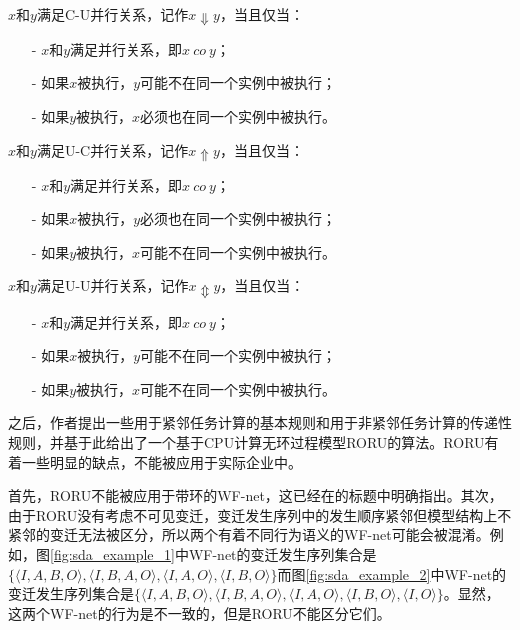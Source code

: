 \begin{definition}\label{def:c_u_concurrency}
$x$和$y$满足C-U并行关系，记作$x\Downarrow y$，当且仅当：
  \begin{itemize}
    \item[-] $x$和$y$满足并行关系，即$x~co~y$；
    \item[-] 如果$x$被执行，$y$可能不在同一个实例中被执行；
    \item[-] 如果$y$被执行，$x$必须也在同一个实例中被执行。
  \end{itemize}
\end{definition}

\begin{definition}\label{def:u_c_concurrency}
$x$和$y$满足U-C并行关系，记作$x\Uparrow y$，当且仅当：
  \begin{itemize}
    \item[-] $x$和$y$满足并行关系，即$x~co~y$；
    \item[-] 如果$x$被执行，$y$必须也在同一个实例中被执行；
    \item[-] 如果$y$被执行，$x$可能不在同一个实例中被执行。
  \end{itemize}
\end{definition}

\begin{definition}\label{def:u_u_concurrency}
$x$和$y$满足U-U并行关系，记作$x\Updownarrow y$，当且仅当：
  \begin{itemize}
    \item[-] $x$和$y$满足并行关系，即$x~co~y$；
    \item[-] 如果$x$被执行，$y$可能不在同一个实例中被执行；
    \item[-] 如果$y$被执行，$x$可能不在同一个实例中被执行。
  \end{itemize}
\end{definition}

之后，作者提出一些用于紧邻任务计算的基本规则和用于非紧邻任务计算的传递性规则，并基于此给出了一个基于CPU计算无环过程模型RORU的算法。RORU有着一些明显的缺点，不能被应用于实际企业中。

首先，RORU不能被应用于带环的WF-net，这已经在的标题中明确指出。其次，由于RORU没有考虑不可见变迁，变迁发生序列中的发生顺序紧邻但模型结构上不紧邻的变迁无法被区分，所以两个有着不同行为语义的WF-net可能会被混淆。例如，图\ref{fig:sda_example_1}中WF-net的变迁发生序列集合是$\{\langle I,A,B,O\rangle,\langle I,B,A,O\rangle,\langle I,A,O\rangle,\langle I,B,O\rangle\}$而图\ref{fig:sda_example_2}中WF-net的变迁发生序列集合是$\{\langle I,A,B,O\rangle,\langle I,B,A,O\rangle,\langle I,A,O\rangle,\langle I,B,O\rangle,\langle I,O\rangle\}$。显然，这两个WF-net的行为是不一致的，但是RORU不能区分它们。

